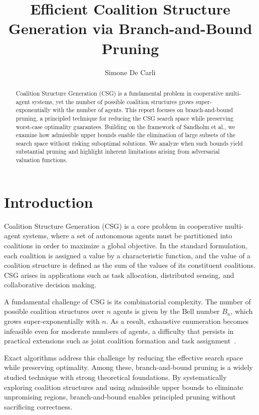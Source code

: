 \documentclass{article}
\title{Efficient Coalition Structure Generation via Branch-and-Bound Pruning}
\author%
{
  Simone De Carli
  \affiliations{Link\"{o}ping University}
  \emails{simde798@student.liu.se}
}
\begin{document}
\maketitle
\begin{abstract}
  Coalition Structure Generation (CSG) is a fundamental problem in cooperative multi-agent systems, yet the number of possible coalition structures grows super-exponentially with the number of agents. This report focuses on branch-and-bound pruning, a principled technique for reducing the CSG search space while preserving worst-case optimality guarantees. Building on the framework of Sandholm et al., we examine how admissible upper bounds enable the elimination of large subsets of the search space without risking suboptimal solutions. We analyze when such bounds yield substantial pruning and highlight inherent limitations arising from adversarial valuation functions.
\end{abstract}

\section{Introduction}

Coalition Structure Generation (CSG) is a core problem in cooperative multi-agent systems, where a set of autonomous agents must be partitioned into coalitions in order to maximize a global objective. In the standard formulation, each coalition is assigned a value by a characteristic function, and the value of a coalition structure is defined as the sum of the values of its constituent coalitions. CSG arises in applications such as task allocation, distributed sensing, and collaborative decision making.

A fundamental challenge of CSG is its combinatorial complexity. The number of possible coalition structures over $n$ agents is given by the Bell number $B_n$, which grows super-exponentially with $n$. As a result, exhaustive enumeration becomes infeasible even for moderate numbers of agents, a difficulty that persists in practical extensions such as joint coalition formation and task assignment~\cite{prantare2017algorithm}.

Exact algorithms address this challenge by reducing the effective search space while preserving optimality. Among these, branch-and-bound pruning is a widely studied technique with strong theoretical foundations. By systematically exploring coalition structures and using admissible upper bounds to eliminate unpromising regions, branch-and-bound enables principled pruning without sacrificing correctness.
\end{document}

